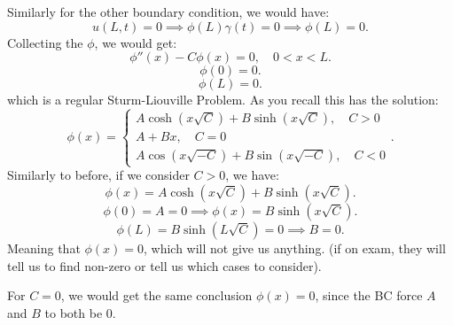 \documentclass[../main/main.tex]{subfiles}
\begin{document}
Similarly for the other boundary condition, we would have: \[
	u(L,t) = 0 \implies \phi(L)\gamma(t) = 0 \implies \phi(L) = 0
.\] Collecting the $\phi$, we would get: \[
\phi''(x) - C\phi(x) = 0, \quad 0 < x <L
.\] \[
\phi(0) = 0
.\] \[
\phi(L)= 0
.\] which is a regular Sturm-Liouville Problem. As you recall this has the solution: \[
\phi(x) = \begin{cases}
	A \cosh (x\sqrt{C} ) + B \sinh(x \sqrt{C} ) , \quad C > 0\\
	A+Bx, \quad C = 0\\
	A \cos(x\sqrt{-C} ) + B\sin(x\sqrt{-C} ) , \quad C < 0
\end{cases}
.\] Similarly to before, if we consider $C>0$, we have: \[
\phi(x) = A \cosh ( x \sqrt{C} ) + B \sinh (x \sqrt{C} )
.\] \[
\phi(0) = A = 0 \implies \phi(x) = B \sinh (x \sqrt{ C} )
.\] \[
\phi(L) = B \sinh(L \sqrt{C} ) = 0 \implies B = 0 
.\] Meaning that $\phi(x) = 0$, which will not give us anything. (if on exam, they will tell us to find non-zero or tell us which cases to consider).

For $C=0$, we would get the same conclusion $\phi(x) = 0$, since the BC force $A$ and $B$ to both be 0.
\end{document}
